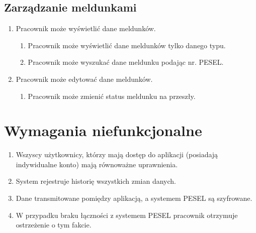 \documentclass[12pt]{article}
\begin{document}
\subsection{Zarządzanie meldunkami}
\begin{enumerate}
    \item Pracownik może wyświetlić dane meldunków.
    \begin{enumerate}
        \item Pracownik może wyświetlić dane meldunków tylko danego typu.
        \item Pracownik może wyszukać dane meldunku podając nr. PESEL.
    \end{enumerate}
    \item Pracownik może edytować dane meldunków.
    \begin{enumerate}
        \item Pracownik może zmienić status meldunku na przeszły.
    \end{enumerate}
\end{enumerate}
\section{Wymagania niefunkcjonalne}
\begin{enumerate}
    \item Wszyscy użytkownicy, którzy mają dostęp do aplikacji (posiadają indywidualne konto) mają równoważne uprawnienia.
    \item System rejestruje historię wszystkich zmian danych.
    \item Dane transmitowane pomiędzy aplikacją, a systemem PESEL są szyfrowane.
    \item W przypadku braku łączności z systemem PESEL pracownik otrzymuje ostrzeżenie o tym fakcie.
\end{enumerate}
\end{document}
